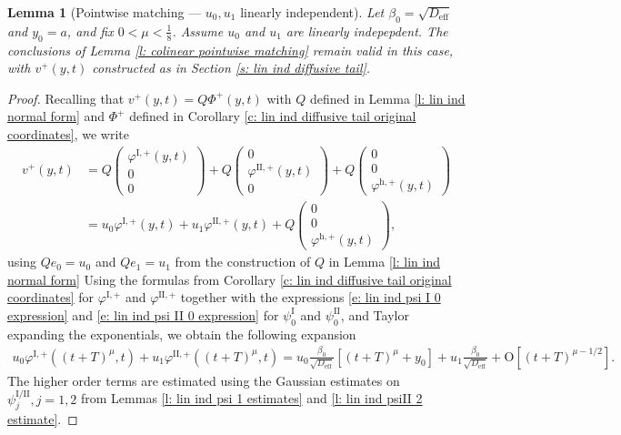 \documentclass[11pt]{article}
\renewcommand{\phi}{\varphi}
\newtheorem{lemma}[prop]{Lemma}
\numberwithin{equation}{section}
\numberwithin{prop}{section}
\newcommand{\Deff}{D_\mathrm{eff}}
\newcommand{\phihp}{\phi^\mathrm{h, +}}
\newcommand{\phiIp}{\phi^{\mathrm{I},+}}
\newcommand{\psiI}{\psi^\mathrm{I}}
\newcommand{\psiII}{\psi^\mathrm{II}}
\newcommand{\phiIIp}{\phi^{\mathrm{II},+}}
\begin{document}
\begin{lemma}[Pointwise matching --- $u_0, u_1$ linearly independent]\label{l: lin ind pointwise matching}
	Let $\beta_0 = \sqrt{\Deff}$ and $y_0 = a$, and fix $0 < \mu < \frac{1}{8}$. Assume $u_0$ and $u_1$ are linearly indepepdent. The conclusions of Lemma \ref{l: colinear pointwise matching} remain valid in this case, with $v^+(y,t)$ constructed as in Section \ref{s: lin ind diffusive tail}. 
\end{lemma}
\begin{proof}
	Recalling that $v^+(y,t) = Q \Phi^+(y,t)$ with $Q$ defined in Lemma \ref{l: lin ind normal form} and $\Phi^+$ defined in Corollary \ref{c: lin ind diffusive tail original coordinates}, we write
	\begin{align*}
	v^+(y,t) &= Q \begin{pmatrix}
	\phiIp(y,t) \\ 0 \\ 0 
	\end{pmatrix}
	+ Q \begin{pmatrix} 0 \\ \phiIIp(y,t) \\ 0 \end{pmatrix}
	+ Q \begin{pmatrix}0 \\ 0 \\ \phihp (y,t) \end{pmatrix} \\
	&= u_0 \phiIp(y,t) + u_1 \phiIIp(y,t) + Q \begin{pmatrix}0 \\ 0 \\ \phihp (y,t) \end{pmatrix},
	\end{align*}
	using $Qe_0 = u_0$ and $Q e_1 = u_1$ from the construction of $Q$ in Lemma \ref{l: lin ind normal form} Using the formulas from Corollary \ref{c: lin ind diffusive tail original coordinates} for $\phiIp$ and $\phiIIp$ together with the expressions \eqref{e: lin ind psi I 0 expression} and \eqref{e: lin ind psi II 0 expression} for $\psiI_0$ and $\psiII_0$, and Taylor expanding the exponentials, we obtain the following expansion
	\begin{align}
	u_0 \phiIp((t+T)^\mu, t) + u_1 \phiIIp((t+T)^\mu, t) = u_0 \frac{\beta_0}{\sqrt{\Deff}} \left[ (t+T)^\mu + y_0 \right]  + u_1 \frac{\beta_0}{\sqrt{\Deff}} + \mathrm{O}[(t+T)^{\mu-1/2}]. \label{e: lin ind intermediate tail asymptotics}
	\end{align}
	The higher order terms are estimated using the Gaussian estimates on $\psi^\mathrm{I/II}_j, j = 1, 2$ from Lemmas \ref{l: lin ind psi 1 estimates} and \ref{l: lin ind psiII 2 estimate}. 

\end{proof}
\end{document}
